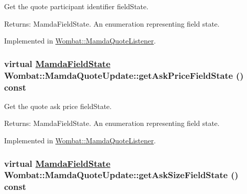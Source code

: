 Get the quote participant identifier field\-State. 

\begin{Desc}
\item[Returns:]Mamda\-Field\-State. An enumeration representing field state. \end{Desc}


Implemented in \hyperlink{classWombat_1_1MamdaQuoteListener_01e681d0b51718516807df702714f7ba}{Wombat::Mamda\-Quote\-Listener}.\hypertarget{classWombat_1_1MamdaQuoteUpdate_4cf2bd78fd61f69aaafc8ed4af31b3b8}{
\subsubsection[getAskPriceFieldState]{\setlength{\rightskip}{0pt plus 5cm}virtual \hyperlink{namespaceWombat_93aac974f2ab713554fd12a1fa3b7d2a}{Mamda\-Field\-State} Wombat::Mamda\-Quote\-Update::get\-Ask\-Price\-Field\-State () const}}
\label{classWombat_1_1MamdaQuoteUpdate_4cf2bd78fd61f69aaafc8ed4af31b3b8}


Get the quote ask price field\-State. 

\begin{Desc}
\item[Returns:]Mamda\-Field\-State. An enumeration representing field state. \end{Desc}


Implemented in \hyperlink{classWombat_1_1MamdaQuoteListener_28dd174c3b718a3def1d09b04ab68577}{Wombat::Mamda\-Quote\-Listener}.\hypertarget{classWombat_1_1MamdaQuoteUpdate_652ce021514fb63b79c95c95783ae418}{
\subsubsection[getAskSizeFieldState]{\setlength{\rightskip}{0pt plus 5cm}virtual \hyperlink{namespaceWombat_93aac974f2ab713554fd12a1fa3b7d2a}{Mamda\-Field\-State} Wombat::Mamda\-Quote\-Update::get\-Ask\-Size\-Field\-State () const}}
\label{classWombat_1_1MamdaQuoteUpdate_652ce021514fb63b79c95c95783ae418}


